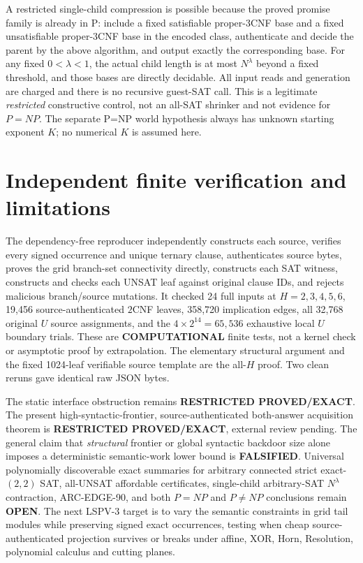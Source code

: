 \documentclass[11pt]{article}
\begin{document}
A restricted single-child compression is possible because the proved promise family is already in P: include a fixed satisfiable proper-3CNF base and a fixed unsatisfiable proper-3CNF base in the encoded class, authenticate and decide the parent by the above algorithm, and output exactly the corresponding base. For any fixed $0<\lambda<1$, the actual child length is at most $N^\lambda$ beyond a fixed threshold, and those bases are directly decidable. All input reads and generation are charged and there is no recursive guest-SAT call. This is a legitimate \emph{restricted} constructive control, not an all-SAT shrinker and not evidence for $P=NP$. The separate P=NP world hypothesis always has unknown starting exponent $K$; no numerical $K$ is assumed here.

\section{Independent finite verification and limitations}
The dependency-free reproducer independently constructs each source, verifies every signed occurrence and unique ternary clause, authenticates source bytes, proves the grid branch-set connectivity directly, constructs each SAT witness, constructs and checks each UNSAT leaf against original clause IDs, and rejects malicious branch/source mutations. It checked 24 full inputs at $H=2,3,4,5,6$, 19,456 source-authenticated $2$CNF leaves, 358,720 implication edges, all 32,768 original $U$ source assignments, and the $4\times2^{14}=65,536$ exhaustive local $U$ boundary trials. These are \textbf{COMPUTATIONAL} finite tests, not a kernel check or asymptotic proof by extrapolation. The elementary structural argument and the fixed 1024-leaf verifiable source template are the all-$H$ proof. Two clean reruns gave identical raw JSON bytes.

The static interface obstruction remains \textbf{RESTRICTED PROVED/EXACT}. The present high-syntactic-frontier, source-authenticated both-answer acquisition theorem is \textbf{RESTRICTED PROVED/EXACT}, external review pending. The general claim that \emph{structural} frontier or global syntactic backdoor size alone imposes a deterministic semantic-work lower bound is \textbf{FALSIFIED}. Universal polynomially discoverable exact summaries for arbitrary connected strict exact-$(2,2)$ SAT, all-UNSAT affordable certificates, single-child arbitrary-SAT $N^\lambda$ contraction, ARC-EDGE-90, and both $P=NP$ and $P\ne NP$ conclusions remain \textbf{OPEN}. The next LSPV-3 target is to vary the semantic constraints in grid tail modules while preserving signed exact occurrences, testing when cheap source-authenticated projection survives or breaks under affine, XOR, Horn, Resolution, polynomial calculus and cutting planes.



\end{document}

